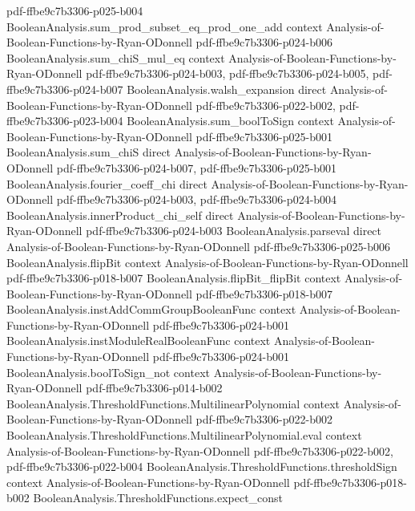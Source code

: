 \begin{lemma}
  {pdf-ffbe9c7b3306-p025-b004}
\proofstep
  {BooleanAnalysis.sum_prod_subset_eq_prod_one_add}
  {context}
  {Analysis-of-Boolean-Functions-by-Ryan-ODonnell}
  {pdf-ffbe9c7b3306-p024-b006}
\proofstep
  {BooleanAnalysis.sum_chiS_mul_eq}
  {context}
  {Analysis-of-Boolean-Functions-by-Ryan-ODonnell}
  {pdf-ffbe9c7b3306-p024-b003,
    pdf-ffbe9c7b3306-p024-b005,
    pdf-ffbe9c7b3306-p024-b007}
\proofstep
  {BooleanAnalysis.walsh_expansion}
  {direct}
  {Analysis-of-Boolean-Functions-by-Ryan-ODonnell}
  {pdf-ffbe9c7b3306-p022-b002,
    pdf-ffbe9c7b3306-p023-b004}
\proofstep
  {BooleanAnalysis.sum_boolToSign}
  {context}
  {Analysis-of-Boolean-Functions-by-Ryan-ODonnell}
  {pdf-ffbe9c7b3306-p025-b001}
\proofstep
  {BooleanAnalysis.sum_chiS}
  {direct}
  {Analysis-of-Boolean-Functions-by-Ryan-ODonnell}
  {pdf-ffbe9c7b3306-p024-b007,
    pdf-ffbe9c7b3306-p025-b001}
\proofstep
  {BooleanAnalysis.fourier_coeff_chi}
  {direct}
  {Analysis-of-Boolean-Functions-by-Ryan-ODonnell}
  {pdf-ffbe9c7b3306-p024-b003,
    pdf-ffbe9c7b3306-p024-b004}
\proofstep
  {BooleanAnalysis.innerProduct_chi_self}
  {direct}
  {Analysis-of-Boolean-Functions-by-Ryan-ODonnell}
  {pdf-ffbe9c7b3306-p024-b003}
\proofstep
  {BooleanAnalysis.parseval}
  {direct}
  {Analysis-of-Boolean-Functions-by-Ryan-ODonnell}
  {pdf-ffbe9c7b3306-p025-b006}
\proofstep
  {BooleanAnalysis.flipBit}
  {context}
  {Analysis-of-Boolean-Functions-by-Ryan-ODonnell}
  {pdf-ffbe9c7b3306-p018-b007}
\proofstep
  {BooleanAnalysis.flipBit_flipBit}
  {context}
  {Analysis-of-Boolean-Functions-by-Ryan-ODonnell}
  {pdf-ffbe9c7b3306-p018-b007}
\proofstep
  {BooleanAnalysis.instAddCommGroupBooleanFunc}
  {context}
  {Analysis-of-Boolean-Functions-by-Ryan-ODonnell}
  {pdf-ffbe9c7b3306-p024-b001}
\proofstep
  {BooleanAnalysis.instModuleRealBooleanFunc}
  {context}
  {Analysis-of-Boolean-Functions-by-Ryan-ODonnell}
  {pdf-ffbe9c7b3306-p024-b001}
\proofstep
  {BooleanAnalysis.boolToSign_not}
  {context}
  {Analysis-of-Boolean-Functions-by-Ryan-ODonnell}
  {pdf-ffbe9c7b3306-p014-b002}
\proofstep
  {BooleanAnalysis.ThresholdFunctions.MultilinearPolynomial}
  {context}
  {Analysis-of-Boolean-Functions-by-Ryan-ODonnell}
  {pdf-ffbe9c7b3306-p022-b002}
\proofstep
  {BooleanAnalysis.ThresholdFunctions.MultilinearPolynomial.eval}
  {context}
  {Analysis-of-Boolean-Functions-by-Ryan-ODonnell}
  {pdf-ffbe9c7b3306-p022-b002,
    pdf-ffbe9c7b3306-p022-b004}
\proofstep
  {BooleanAnalysis.ThresholdFunctions.thresholdSign}
  {context}
  {Analysis-of-Boolean-Functions-by-Ryan-ODonnell}
  {pdf-ffbe9c7b3306-p018-b002}
\proofstep
  {BooleanAnalysis.ThresholdFunctions.expect_const}

\end{lemma}
